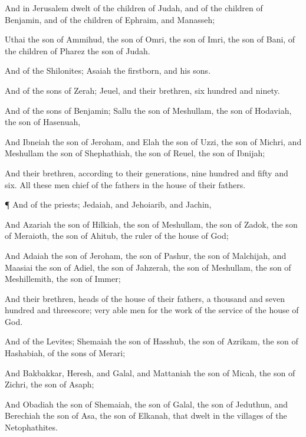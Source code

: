 {And in
Jerusalem
dwelt of the
children of
Judah, and of the
children of
Benjamin, and of the
children of
Ephraim, and
Manasseh;

Uthai the
son of
Ammihud, the
son of
Omri, the
son of
Imri, the
son of
Bani, of the
children of
Pharez the
son of
Judah.

And of the
Shilonites;
Asaiah the
firstborn, and his
sons.

And of the
sons of
Zerah;
Jeuel, and their
brethren,
six
hundred and
ninety.

And of the
sons of
Benjamin;
Sallu the
son of
Meshullam, the
son of
Hodaviah, the
son of
Hasenuah,

And
Ibneiah the
son of
Jeroham, and
Elah the
son of
Uzzi, the
son of
Michri, and
Meshullam the
son of
Shephathiah, the
son of
Reuel, the
son of
Ibnijah;

And their
brethren, according to their
generations,
nine
hundred and
fifty and
six. All these
men
{}
chief of the
fathers in the
house of their
fathers.


\par }{\PP {}¶ And of the
priests;
Jedaiah, and
Jehoiarib, and
Jachin,

And
Azariah the
son of
Hilkiah, the
son of
Meshullam, the
son of
Zadok, the
son of
Meraioth, the
son of
Ahitub, the
ruler of the
house of
God;

And
Adaiah the
son of
Jeroham, the
son of
Pashur, the
son of
Malchijah, and
Maasiai the
son of
Adiel, the
son of
Jahzerah, the
son of
Meshullam, the
son of
Meshillemith, the
son of
Immer;

And their
brethren,
heads of the
house of their
fathers, a
thousand and
seven
hundred and
threescore; very
able
men for the
work of the
service of the
house of
God.


\par }{\PP {}And of the
Levites;
Shemaiah the
son of
Hasshub, the
son of
Azrikam, the
son of
Hashabiah, of the
sons of
Merari;

And
Bakbakkar,
Heresh, and
Galal, and
Mattaniah the
son of
Micah, the
son of
Zichri, the
son of
Asaph;

And
Obadiah the
son of
Shemaiah, the
son of
Galal, the
son of
Jeduthun, and
Berechiah the
son of
Asa, the
son of
Elkanah, that
dwelt in the
villages of the
Netophathites.

}
